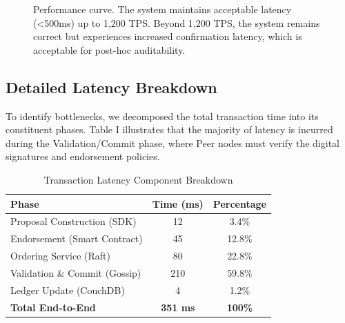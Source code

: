\documentclass[conference]{IEEEtran}
\begin{document}
\begin{figure}[htbp]
\centering
{}
\caption{Performance curve. The system maintains acceptable latency (<500ms) up to 1,200 TPS. Beyond 1,200 TPS, the system remains correct but experiences increased confirmation latency, which is acceptable for post-hoc auditability.}
\label{fig:throughput}
\end{figure}

\subsection{Detailed Latency Breakdown}
To identify bottlenecks, we decomposed the total transaction time into its constituent phases. Table I illustrates that the majority of latency is incurred during the Validation/Commit phase, where Peer nodes must verify the digital signatures and endorsement policies.

\begin{table}[htbp]
\caption{Transaction Latency Component Breakdown}
\begin{center}
\begin{tabular}{lcc}
\toprule
\textbf{Phase} & \textbf{Time (ms)} & \textbf{Percentage} \\
\midrule
Proposal Construction (SDK) & 12 & 3.4\% \\
Endorsement (Smart Contract) & 45 & 12.8\% \\
Ordering Service (Raft) & 80 & 22.8\% \\
Validation \& Commit (Gossip) & 210 & 59.8\% \\
Ledger Update (CouchDB) & 4 & 1.2\% \\
\midrule
\textbf{Total End-to-End} & \textbf{351 ms} & \textbf{100\%} \\
\bottomrule
\end{tabular}
\end{center}
\end{table}
\end{document}
